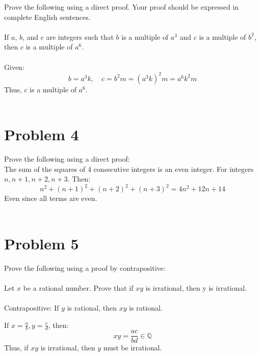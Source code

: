 \documentclass{amsart}
\theoremstyle{definition}
\theoremstyle{Exercise}
\theoremstyle{remark}
\theoremstyle{rule}
\numberwithin{equation}{section}
\begin{document}
Prove the following using a direct proof. Your proof should be expressed in complete English sentences.
\\\\

If $a$, $b$, and $c$ are integers such that $b$ is a multiple of $a^3$ and $c$ is a multiple of $b^2$, then $c$ is a multiple of $a^6$.
\\\\
Given:
\[
b = a^3k,\quad c = b^2m = (a^3k)^2m = a^6k^2m
\]
Thus, \( c \) is a multiple of \( a^6 \). 
\\\\

\newpage
\section*{Problem 4}
Prove the following using a direct proof:
\\

The sum of the squares of 4 consecutive integers is an even integer.
For integers \( n, n+1, n+2, n+3 \). Then:
\[
n^2 + (n+1)^2 + (n+2)^2 + (n+3)^2 = 4n^2 + 12n + 14
\]
Even since all terms are even.
\\\\


 \newpage
\section*{Problem 5}

Prove the following using a proof by contrapositive:
\\\\

Let $x$ be a rational number. Prove that if $xy$ is irrational, then y is irrational.\\\\
Contrapositive: If \( y \) is rational, then \( xy \) is rational.

If \( x = \frac{a}{b}, y = \frac{c}{d} \), then:
\[
xy = \frac{ac}{bd} \in \mathbb{Q}
\]
Thus, if \( xy \) is irrational, then \( y \) must be irrational.
\\\\
\end{document}
